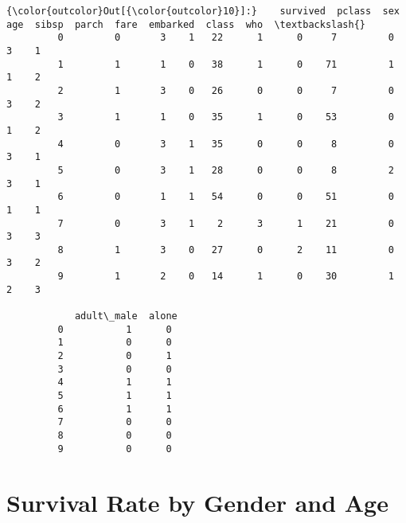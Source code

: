 \documentclass[11pt]{article}
\begin{document}
\begin{Verbatim}[commandchars=\\\{\}]
{\color{outcolor}Out[{\color{outcolor}10}]:}    survived  pclass  sex  age  sibsp  parch  fare  embarked  class  who  \textbackslash{}
         0         0       3    1   22      1      0     7         0      3    1   
         1         1       1    0   38      1      0    71         1      1    2   
         2         1       3    0   26      0      0     7         0      3    2   
         3         1       1    0   35      1      0    53         0      1    2   
         4         0       3    1   35      0      0     8         0      3    1   
         5         0       3    1   28      0      0     8         2      3    1   
         6         0       1    1   54      0      0    51         0      1    1   
         7         0       3    1    2      3      1    21         0      3    3   
         8         1       3    0   27      0      2    11         0      3    2   
         9         1       2    0   14      1      0    30         1      2    3   
         
            adult\_male  alone  
         0           1      0  
         1           0      0  
         2           0      1  
         3           0      0  
         4           1      1  
         5           1      1  
         6           1      1  
         7           0      0  
         8           0      0  
         9           0      0  
\end{Verbatim}
            
    \section{Survival Rate by Gender and
Age}\label{survival-rate-by-gender-and-age}
\end{document}
